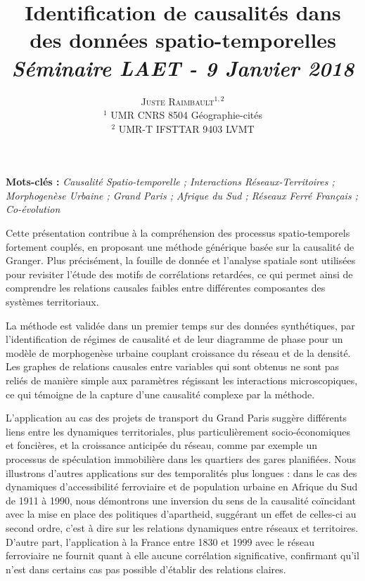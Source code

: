 \documentclass[11pt]{article}
\newcommand{\noun}[1]{\textsc{#1}}
\begin{document}
\title{Identification de causalités dans des données spatio-temporelles
\bigskip\\
\textit{Séminaire LAET - 9 Janvier 2018}
}
\author{\noun{Juste Raimbault}$^{1,2}$\medskip\\
$^1$ UMR CNRS 8504 Géographie-cités\\
$^2$ UMR-T IFSTTAR 9403 LVMT
}
\date{}

\maketitle

\justify



\textbf{Mots-clés : }\textit{Causalité Spatio-temporelle ; Interactions Réseaux-Territoires ; Morphogenèse Urbaine ; Grand Paris ; Afrique du Sud ; Réseaux Ferré Français ; Co-évolution}

\bigskip

Cette présentation contribue à la compréhension des processus spatio-temporels fortement couplés, en proposant une méthode générique basée sur la causalité de Granger. Plus précisément, la fouille de donnée et l'analyse spatiale sont utilisées pour revisiter l'étude des motifs de corrélations retardées, ce qui permet ainsi de comprendre les relations causales faibles entre différentes composantes des systèmes territoriaux.

La méthode est validée dans un premier temps sur des données synthétiques, par l'identification de régimes de causalité et de leur diagramme de phase pour un modèle de morphogenèse urbaine couplant croissance du réseau et de la densité. Les graphes de relations causales entre variables qui sont obtenus ne sont pas reliés de manière simple aux paramètres régissant les interactions microscopiques, ce qui témoigne de la capture d'une causalité complexe par la méthode.

L'application au cas des projets de transport du Grand Paris suggère différents liens entre les dynamiques territoriales, plus particulièrement socio-économiques et foncières, et la croissance anticipée du réseau, comme par exemple un processus de spéculation immobilière dans les quartiers des gares planifiées. Nous illustrons d'autres applications sur des temporalités plus longues : dans le cas des dynamiques d'accessibilité ferroviaire et de population urbaine en Afrique du Sud de 1911 à 1990, nous démontrons une inversion du sens de la causalité coïncidant avec la mise en place des politiques d'apartheid, suggérant un effet de celles-ci au second ordre, c'est à dire sur les relations dynamiques entre réseaux et territoires. D'autre part, l'application à la France entre 1830 et 1999 avec le réseau ferroviaire ne fournit quant à elle aucune corrélation significative, confirmant qu'il n'est dans certains cas pas possible d'établir des relations claires.
\end{document}
